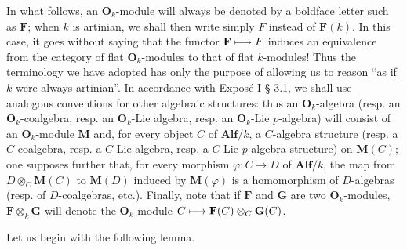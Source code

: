 In what follows, an $\mathbf O_k$-module will always be denoted by a boldface letter such as $\mathbf F$; when $k$ is artinian, we shall then write simply $F$ instead of $\mathbf F(k)$. In this case, it goes without saying that the functor $\mathbf F\longmapsto F$ induces an equivalence from the category of flat $\mathbf O_k$-modules to that of flat $k$-modules! Thus the terminology we have adopted has only the purpose of allowing us to reason ``as if $k$ were always artinian''.
In accordance with Exposé I § 3.1, we shall use analogous conventions for other algebraic structures: thus an $\mathbf O_k$-algebra (resp. an $\mathbf O_k$-coalgebra, resp. an $\mathbf O_k$-Lie algebra, resp. an $\mathbf O_k$-Lie $p$-algebra) will consist of an $\mathbf O_k$-module $\mathbf M$ and, for every object $C$ of $\mathbf{Alf}/k$, a $C$-algebra structure (resp. a $C$-coalgebra, resp. a $C$-Lie algebra, resp. a $C$-Lie $p$-algebra structure) on $\mathbf M(C)$; one supposes further that, for every morphism $\varphi:C\to D$ of $\mathbf{Alf}/k$, the map from $D\otimes_C\mathbf M(C)$ to $\mathbf M(D)$ induced by $\mathbf M(\varphi)$ is a homomorphism of $D$-algebras (resp. of $D$-coalgebras, etc.).
Finally, note that if $\mathbf F$ and $\mathbf G$ are two $\mathbf O_k$-modules, $\mathbf F\otimes_k\mathbf G$ will denote the $\mathbf O_k$-module $C\longmapsto\mathbf F(C)\otimes_C\mathbf G(C)$.

Let us begin with the following lemma.
